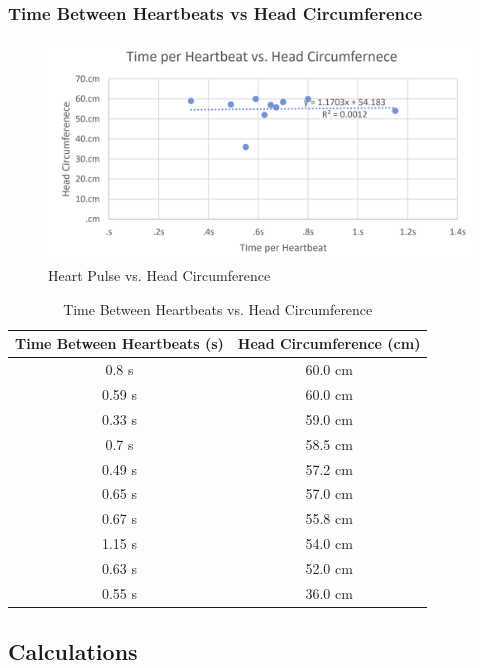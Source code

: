\documentclass{article}
\begin{document}
\subsubsection{Time Between Heartbeats vs Head Circumference}
\begin{figure}[H]
    \caption{Heart Pulse vs. Head Circumference}
    \label{plot:3}
    \includegraphics[width=16cm]{lab1_plot2.png}
\end{figure}

\begin{table}[H]
\caption{Time Between Heartbeats vs. Head Circumference}\vspace{0.5em}
\label{tab:4}
\centering
\begin{tabular}{|c|c|}
    \hline
    \rowcolor{black}
    \color{white} Time Between Heartbeats (s) & \color{white} Head Circumference (cm) \\
    \hline
    0.8 s  & 60.0 cm \\
    \hline
    0.59 s & 60.0 cm \\
    \hline
    0.33 s & 59.0 cm \\
    \hline
    0.7 s  & 58.5 cm \\
    \hline
    0.49 s & 57.2 cm \\
    \hline
    0.65 s & 57.0 cm \\
    \hline
    0.67 s & 55.8 cm \\
    \hline
    1.15 s & 54.0 cm \\
    \hline
    0.63 s & 52.0 cm \\
    \hline
    0.55 s & 36.0 cm \\

    \hline
\end{tabular} 
\end{table}

\subsection{Calculations}
\end{document}
